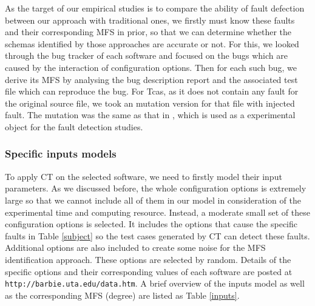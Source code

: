 \documentclass{sig-alternate}
\begin{document}
As the target of our empirical studies is to compare the ability of fault defection between our approach with traditional ones, we firstly must know these faults and their corresponding MFS in prior, so that we can determine whether the schemas identified by those approaches are accurate or not.  For this, we looked through the bug tracker of each software and focused on the bugs which are caused by the interaction of configuration options. Then for each such bug, we derive its MFS by analysing the bug description report and the associated test file which can reproduce the bug. For Tcas, as it does not contain any fault for the original source file, we took an mutation version for that file with injected fault. The mutation was the same as that in \cite{kuhn2006pseudo}, which is used as a experimental object for the fault detection studies.



\subsubsection{Specific inputs models}
To apply CT on the selected software, we need to firstly model their input parameters. As we discussed before, the whole configuration options is extremely large so that we cannot include all of them in our model in consideration of the experimental time and computing resource. Instead, a moderate small set of these configuration options is selected.  It includes the options that cause the specific faults in Table \ref{subject} so the test cases generated by CT can detect these faults. Additional options are also included to create some noise for the MFS identification approach. These options are selected by random. Details of the specific options and their corresponding values of each software are posted at \texttt{http://barbie.uta.edu/data.htm}.  A brief overview of the inputs model as well as the corresponding MFS (degree) are listed as Table \ref{inputs}.

\end{document}
